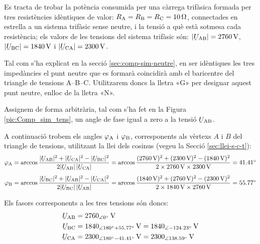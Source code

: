 \begin{exemple}\label{ex:comp-sim}
    Es tracta de trobar la potència consumida per una càrrega trifàsica
    formada per tres resistències idèntiques de valor: $R_\mathrm{A}=R_\mathrm{B}=R_\mathrm{C}=\SI{10}{\ohm}$,
    connectades en estrella a un sistema trifàsic sense neutre, i la
    tensió a què està sotmesa cada resistència; els valors de les
    tensions del sistema trifàsic són: $|\cmplx{U}\ped{AB}| =
    \SI{2760}{V}$, $|\cmplx{U}\ped{BC}| = \SI{1840}{V}$ i
    $|\cmplx{U}\ped{CA}| = \SI{2300}{V}$.

    Tal com s'ha explicat en la secció \vref{sec:comp-sim-neutre}, en ser idèntiques les tres impedàncies el punt neutre que es formarà coincidirà amb el baricentre del triangle de tensions A--B--C. Utilitzarem doncs la lletra «G» per designar aquest punt neutre, enlloc de la lletra «N».

    Assignem de forma arbitrària, tal com s'ha fet en la Figura
    \vref{pic:Comp_sim_tens}, un angle de fase igual a zero a la tensió
    $\cmplx{U}\ped{AB}$.

    \begin{center}
        
    \end{center}

    A continuació trobem els angles $\varphi_\mathrm{A}$ i $\varphi_\mathrm{B}$,
    corresponents als vèrtexs  $A$ i $B$ del triangle de
    tensions, utilitzant la llei dels cosinus (vegeu la Secció
    \vref{sec:llei-s-c-t}): 
    \begin{align*}
        \varphi\ped{A} &= \arccos \frac{|\cmplx{U}\ped{AB}|^2 + |\cmplx{U}\ped{CA}|^2 -
        |\cmplx{U}\ped{BC}|^2}{2 |\cmplx{U}\ped{AB}| \,|\cmplx{U}\ped{CA}|} =
        \arccos \frac{(\SI{2760}{V})^2 + (\SI{2300}{V})^2 - (\SI{1840}{V})^2}{2 \times \SI{2760}{V}
        \times \SI{2300}{V}} = \ang{41,41} \\[1ex]
        \varphi\ped{B} &= \arccos \frac{|\cmplx{U}\ped{BC}|^2 + |\cmplx{U}\ped{AB}|^2 -
        |\cmplx{U}\ped{CA}|^2}{2 |\cmplx{U}\ped{BC}| \,|\cmplx{U}\ped{AB}|} =
        \arccos \frac{(\SI{1840}{V})^2 + (\SI{2760}{V})^2 - (\SI{2300}{V})^2}{2 \times \SI{1840}{V}
        \times \SI{2760}{V}} = \ang{55,77}
    \end{align*}

    Els fasors corresponents a les tres tensions són doncs:
    \begin{align*}
    \cmplx{U}\ped{AB} &= \SIpd{2760}{0}{V} \\
    \cmplx{U}\ped{BC} &= \num{1840}_{\angle\ang{180} + \ang{55,77}}\si{\,V} =
    \SIpd{1840}{-124,23}{V} \\
    \cmplx{U}\ped{CA} &= \num{2300}_{\angle\ang{180} - \ang{41,41}}\si{\,V} = \SIpd{2300}{138,59}{V}
    \end{align*}


\end{exemple}
